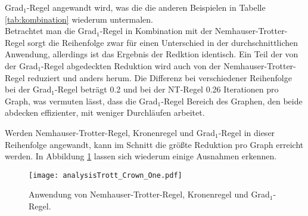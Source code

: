 Grad$_{1}$-Regel angewandt wird, was die die anderen Beispielen in Tabelle \ref{tab:kombination} wiederum untermalen.\\
Betrachtet man die Grad$_{1}$-Regel in Kombination mit der Nemhauser-Trotter-Regel sorgt die Reihenfolge zwar für einen Unterschied in der durchschnittlichen Anwendung, allerdings ist das Ergebnis der Redktion identisch. Ein Teil der von der Grad$_{1}$-Regel abgedeckten Reduktion wird auch von der Nemhauser-Trotter-Regel reduziert und anders herum. Die Differenz bei verschiedener Reihenfolge bei der Grad$_{1}$-Regel beträgt 0.2 und bei der NT-Regel 0.26 Iterationen pro Graph, was vermuten lässt, dass die Grad$_{1}$-Regel Bereich des Graphen, den beide abdecken effizienter, mit weniger Durchläufen arbeitet.

Werden Nemhauser-Trotter-Regel, Kronenregel und Grad$_{1}$-Regel in dieser Reihenfolge angewandt, kann im Schnitt die größte Reduktion pro Graph erreicht werden. In Abbildung \ref{fig:trottCrownOne} lassen sich wiederum einige Ausnahmen erkennen. 



\begin{figure}[htb]
\centering
  	{\texttt{[image: analysisTrott\_Crown\_One.pdf]}}
	\caption{Anwendung von Nemhauser-Trotter-Regel, Kronenregel und Grad$_{1}$-Regel.\label{fig:trottCrownOne}}
\centering
\end{figure}


